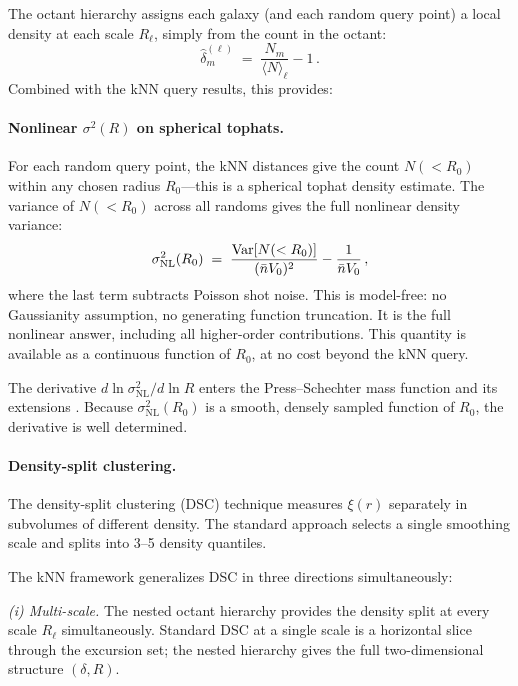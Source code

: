 The octant hierarchy assigns each galaxy (and each random query point) a local density at each scale $R_\ell$, simply from the count in the octant:
\begin{equation}
  \hat{\delta}_m^{(\ell)} \;=\; \frac{N_m}{\langle N\rangle_\ell} - 1\,.
  \label{eq:octant_density}
\end{equation}
Combined with the kNN query results, this provides:

\paragraph{Nonlinear $\sigma^2(R)$ on spherical tophats.}  For each random query point, the kNN distances give the count $N(<R_0)$ within any chosen radius $R_0$---this is a spherical tophat density estimate.  The variance of $N(<R_0)$ across all randoms gives the full nonlinear density variance:
\begin{equation}
  \sigma^2_{\mathrm{NL}}(R_0) \;=\; \frac{\mathrm{Var}[N(<R_0)]}{(\bar{n} V_0)^2} - \frac{1}{\bar{n} V_0}\,,
  \label{eq:sigma_NL}
\end{equation}
where the last term subtracts Poisson shot noise.  This is model-free: no Gaussianity assumption, no generating function truncation.  It is the full nonlinear answer, including all higher-order contributions.  This quantity is available as a continuous function of $R_0$, at no cost beyond the kNN query.

The derivative $d\ln\sigma_{\mathrm{NL}}^2/d\ln R$ enters the Press--Schechter mass function and its extensions \citep{Press1974,Sheth2001}.  Because $\sigma_{\mathrm{NL}}^2(R_0)$ is a smooth, densely sampled function of $R_0$, the derivative is well determined.

\paragraph{Density-split clustering.}  The density-split clustering (DSC) technique \citep{Gruen2016,Friedrich2018,Paillas2024} measures $\xi(r)$ separately in subvolumes of different density.  The standard approach selects a single smoothing scale and splits into 3--5 density quantiles.

The kNN framework generalizes DSC in three directions simultaneously:

\emph{(i) Multi-scale.}  The nested octant hierarchy provides the density split at every scale $R_\ell$ simultaneously.  Standard DSC at a single scale is a horizontal slice through the excursion set; the nested hierarchy gives the full two-dimensional structure $(\delta, R)$.

